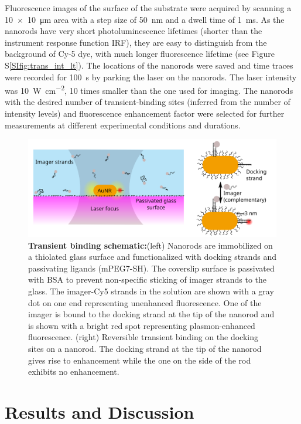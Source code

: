 Fluorescence images of the surface of the substrate were acquired by scanning a \SI[product-units=power]{10x10}{\um} area with a step size of \SI{50}{\nm} and a dwell time of \SI{1}{\ms}.
As the nanorods have very short photoluminescence lifetimes (shorter than the instrument response function IRF), they are easy to distinguish from the background of Cy-5 dye, with much longer fluorescence lifetime (see Figure S\ref{SIfig:trans_int_lt}).
The locations of the nanorods were saved and time traces were recorded for \SI{100}{\s} by parking the laser on the nanorods.
The laser intensity was \SI[per-mode=repeated-symbol]{10}{\watt\per\cm\squared}, 10 times smaller than the one used for imaging.
The nanorods with the desired number of transient-binding sites (inferred from the number of intensity levels) and fluorescence enhancement factor were selected for further measurements at different experimental conditions and durations.
\begin{figure}
	\centering
	\includegraphics[width=\linewidth]{scheme}
	\caption{\textbf{Transient binding schematic:}(left) Nanorods are immobilized on a thiolated glass surface and functionalized with docking strands and passivating ligands (mPEG7-SH).
	The coverslip surface is passivated with BSA to prevent non-specific sticking of imager strands to the glass.
	The imager-Cy5 strands in the solution  are shown with a gray dot on one end representing unenhanced fluorescence.
	One of the imager is bound to the docking strand at the tip of the nanorod and is shown with a bright red spot representing plasmon-enhanced fluorescence.
	(right) Reversible transient binding on the docking sites on a nanorod. The docking strand at the tip of the nanorod gives rise to enhancement while the one on the side of the rod exhibits no enhancement.}
  	\label{sch_trans:setup}
\end{figure}


\section{Results and Discussion}
